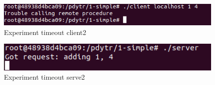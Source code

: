 \documentclass[12pt,journal,compsoc]{IEEEtran}
\begin{document}
\begin{figure}[H]
\centering
\includegraphics[width=125mm]{capturas/experiment-timeout26-client.png}
\caption{Experiment timeout client2}
\label{fig:experiment-timeout-26-client}
\end{figure}

\begin{figure}[H]
\centering
\includegraphics[width=125mm]{capturas/experiment-timeout26-server.png}
\caption{Experiment timeout serve2}
\label{fig:experiment-timeout-26-server}
\end{figure}

\ifCLASSOPTIONcaptionsoff
  \newpage
\fi
\end{document}
